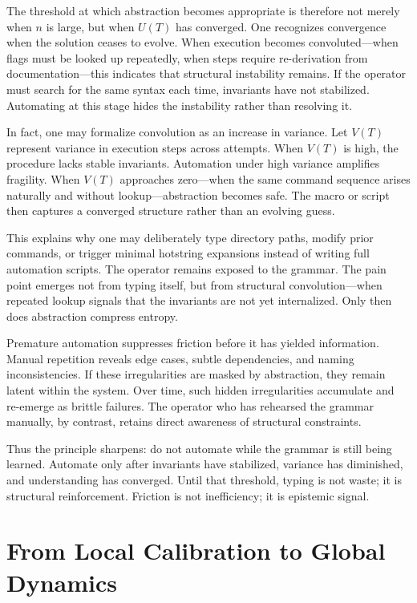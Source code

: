 \documentclass[12pt]{article}
\begin{document}
The threshold at which abstraction becomes appropriate is therefore not merely when $n$ is large, but when $U(T)$ has converged. One recognizes convergence when the solution ceases to evolve. When execution becomes convoluted—when flags must be looked up repeatedly, when steps require re-derivation from documentation—this indicates that structural instability remains. If the operator must search for the same syntax each time, invariants have not stabilized. Automating at this stage hides the instability rather than resolving it.

In fact, one may formalize convolution as an increase in variance. Let $V(T)$ represent variance in execution steps across attempts. When $V(T)$ is high, the procedure lacks stable invariants. Automation under high variance amplifies fragility. When $V(T)$ approaches zero—when the same command sequence arises naturally and without lookup—abstraction becomes safe. The macro or script then captures a converged structure rather than an evolving guess.

This explains why one may deliberately type directory paths, modify prior commands, or trigger minimal hotstring expansions instead of writing full automation scripts. The operator remains exposed to the grammar. The pain point emerges not from typing itself, but from structural convolution—when repeated lookup signals that the invariants are not yet internalized. Only then does abstraction compress entropy.

Premature automation suppresses friction before it has yielded information. Manual repetition reveals edge cases, subtle dependencies, and naming inconsistencies. If these irregularities are masked by abstraction, they remain latent within the system. Over time, such hidden irregularities accumulate and re-emerge as brittle failures. The operator who has rehearsed the grammar manually, by contrast, retains direct awareness of structural constraints.

Thus the principle sharpens: do not automate while the grammar is still being learned. Automate only after invariants have stabilized, variance has diminished, and understanding has converged. Until that threshold, typing is not waste; it is structural reinforcement. Friction is not inefficiency; it is epistemic signal.

\section{From Local Calibration to Global Dynamics}
\end{document}
